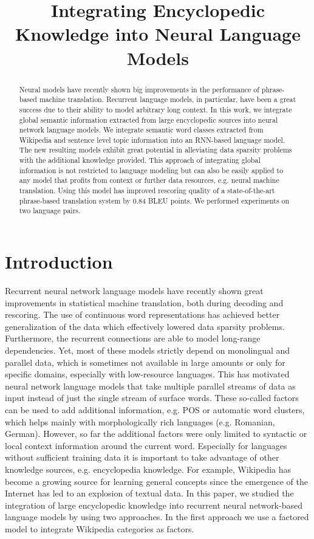 \documentclass[a4paper]{article}
\title{Integrating Encyclopedic Knowledge into Neural Language Models}
\begin{document}
\maketitle
%
\begin{abstract}
Neural models have recently shown big improvements in the performance of phrase-based machine translation. Recurrent language models, in particular, have been a great success due to their ability to model arbitrary long context. In this work, we integrate global semantic information extracted from large encyclopedic sources into neural network language models. We integrate semantic word classes extracted from Wikipedia and sentence level topic information into an RNN-based language model.
The new resulting models exhibit great potential in alleviating data sparsity problems with the additional knowledge provided. This approach of integrating global information is not restricted to language modeling but can also be easily applied to any model that profits from context or further data resources, e.g. neural machine translation. Using this model has improved rescoring quality of a state-of-the-art phrase-based translation system by 0.84 BLEU points. We performed experiments on two language pairs.



\end{abstract}


%
\section{Introduction}
Recurrent neural network language models have recently shown great improvements in statistical machine translation, both during decoding and rescoring. The use of continuous word representations has achieved better generalization of the data which effectively lowered data sparsity problems. Furthermore, the recurrent connections are able to model long-range dependencies. Yet, most of these models strictly depend on monolingual and parallel data, which is sometimes not available in large amounts or only for specific domains, especially with low-resource languages.
This has motivated neural network language models that take multiple parallel streams of data as input instead of just the single stream of surface words. These so-called factors can be used to add additional information, e.g. POS or automatic word clusters, which helps mainly with morphologically rich languages (e.g. Romanian, German). However, so far the additional factors were only limited to syntactic or local context information around the current word. Especially for languages without sufficient training data it is important to take advantage of other knowledge sources, e.g. encyclopedia knowledge. For example, Wikipedia has become a growing source for learning general concepts since the emergence of the Internet has led to an explosion of textual data. 
In this paper, we studied the integration of large encyclopedic knowledge into recurrent neural network-based language models by using two approaches. 
In the first approach we use a factored model to integrate Wikipedia categories as factors. 
\end{document}
